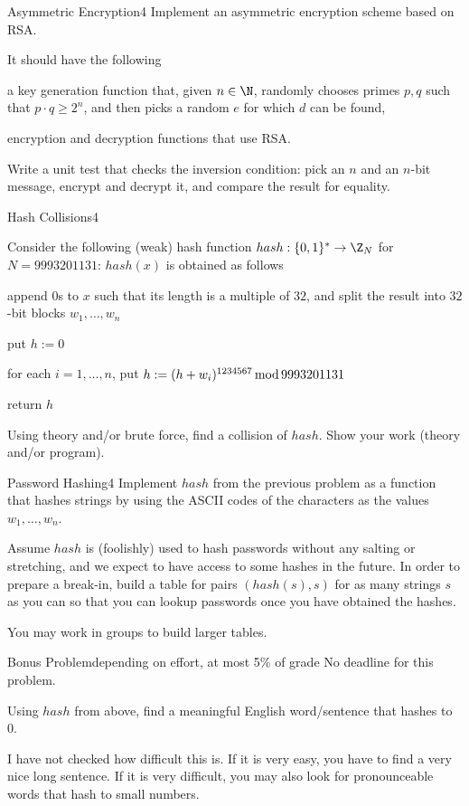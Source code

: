 \documentclass[a4paper]{article}
\begin{document}
\header

\begin{problem}{Asymmetric Encryption}{4}
Implement an asymmetric encryption scheme based on RSA.

It should have the following
\begin{compactitem}
 \item a key generation function that, given $n\in \N$, randomly chooses primes $p,q$ such that $p\cdot q\geq 2^n$, and then picks a random $e$ for which $d$ can be found,
 \item encryption and decryption functions that use RSA.
\end{compactitem}

Write a unit test that checks the inversion condition: pick an $n$ and an $n$-bit message, encrypt and decrypt it, and compare the result for equality.
\end{problem}

\begin{problem}{Hash Collisions}{4}

Consider the following (weak) hash function $hash:\{0,1\}^*\to \Z_N$ for $N=9993201131$: $hash(x)$ is obtained as follows
\begin{compactenum}
 \item append $0$s to $x$ such that its length is a multiple of $32$, and split the result into $32$-bit blocks $w_1,\ldots, w_n$
 \item put $h:=0$
 \item for each $i=1,\ldots,n$, put $h:=(h+w_i)^{1234567}\mathop{\mathrm{mod}} 9993201131$
 \item return $h$
\end{compactenum}

Using theory and/or brute force, find a collision of $hash$.
Show your work (theory and/or program).
\end{problem}

\begin{problem}{Password Hashing}{4}
Implement $hash$ from the previous problem as a function that hashes strings by using the ASCII codes of the characters as the values $w_1,\ldots,w_n$.

Assume $hash$ is (foolishly) used to hash passwords without any salting or stretching, and we expect to have access to some hashes in the future.
In order to prepare a break-in, build a table for pairs $(hash(s),s)$ for as many strings $s$ as you can so that you can lookup passwords once you have obtained the hashes.

You may work in groups to build larger tables.
\end{problem}


\begin{problem}{Bonus Problem}{depending on effort, at most 5\% of grade}
No deadline for this problem.

Using $hash$ from above, find a meaningful English word/sentence that hashes to $0$.

I have not checked how difficult this is.
If it is very easy, you have to find a very nice long sentence.
If it is very difficult, you may also look for pronounceable words that hash to small numbers. 
\end{problem}
\end{document}

